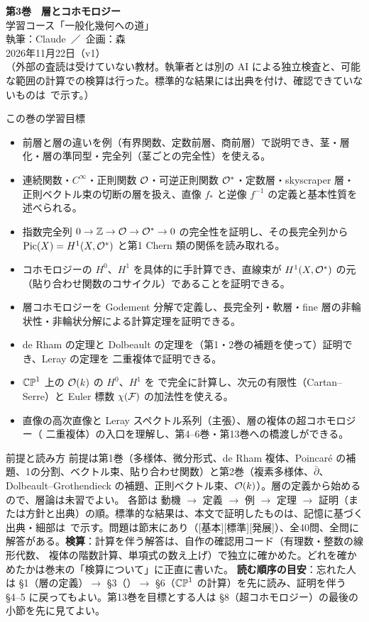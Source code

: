 \sloppy
\begin{center}
{\LARGE\bfseries\sffamily 第3巻　層とコホモロジー}\\[8pt]
{\large 学習コース「一般化幾何への道」}\\[6pt]
{\large 執筆：Claude\ ／\ 企画：森}\\[3pt]
2026年11月22日（v1）\\[3pt]
{\small （外部の査読は受けていない教材。執筆者とは別の AI による独立検査と、可能な範囲の計算での検算は行った。標準的な結果には出典を付け、確認できていないものは\tQ\ で示す。）}
\end{center}
\medskip
\begin{goalbox}{この巻の学習目標}
\begin{itemize}
\item 前層と層の違いを例（有界関数、定数前層、商前層）で説明でき、茎・層化・層の準同型・完全列（茎ごとの完全性）を使える。
\item 連続関数・$C^\infty$・正則関数 $\mathcal O$・可逆正則関数 $\mathcal O^*$・定数層・skyscraper 層・正則ベクトル束の切断の層を扱え、直像 $f_*$ と逆像 $f^{-1}$ の定義と基本性質を述べられる。
\item 指数完全列 $0\to\mathbb Z\to\mathcal O\to\mathcal O^*\to0$ の完全性を証明し、その長完全列から $\mathrm{Pic}(X)=H^1(X,\mathcal O^*)$ と第1 Chern 類の関係を読み取れる。
\item \Cech{} コホモロジーの $H^0$、$H^1$ を具体的に手計算でき、直線束が $H^1(X,\mathcal O^*)$ の元（貼り合わせ関数のコサイクル）であることを証明できる。
\item 層コホモロジーを Godement 分解で定義し、長完全列・軟層・fine 層の非輪状性・非輪状分解による計算定理を証明できる。
\item de Rham の定理と Dolbeault の定理を（第1・2巻の補題を使って）証明でき、Leray の定理を \Cech{} 二重複体で証明できる。
\item $\mathbb{CP}^1$ 上の $\mathcal O(k)$ の $H^0$、$H^1$ を \Cech{} で完全に計算し、次元の有限性（Cartan--Serre）と Euler 標数 $\chi(\mathcal F)$ の加法性を使える。
\item 直像の高次直像と Leray スペクトル系列（主張）、層の複体の超コホモロジー（\Cech{} 二重複体）の入口を理解し、第4--6巻・第13巻への橋渡しができる。
\end{itemize}
\end{goalbox}
\begin{keybox}{前提と読み方}
前提は第1巻（多様体、微分形式、de Rham 複体、Poincar\'e の補題、1の分割、ベクトル束、貼り合わせ関数）と第2巻（複素多様体、$\bar\partial$、Dolbeault--Grothendieck の補題、正則ベクトル束、$\mathcal O(k)$）。層の定義から始めるので、層論は未習でよい。
各節は 動機 $\to$ 定義 $\to$ 例 $\to$ 定理 $\to$ 証明（または方針と出典）の順。標準的な結果は\tC、本文で証明したものは\tP、記憶に基づく出典・細部は\tQ\ で示す。問題は節末にあり（[基本][標準][発展]）、全40問、全問に解答がある。\textbf{検算}：計算を伴う解答は、自作の確認用コード（有理数・整数の線形代数、\Cech{} 複体の階数計算、単項式の数え上げ）で独立に確かめた。どれを確かめたかは巻末の「検算について」に正直に書いた。
\textbf{読む順序の目安}：忘れた人は §1（層の定義）$\to$ §3（\Cech{}）$\to$ §6（$\mathbb{CP}^1$ の計算）を先に読み、証明を伴う §4--5 に戻ってもよい。第13巻を目標とする人は §8（超コホモロジー）の最後の小節を先に見てよい。
\end{keybox}
\tableofcontents
\clearpage

